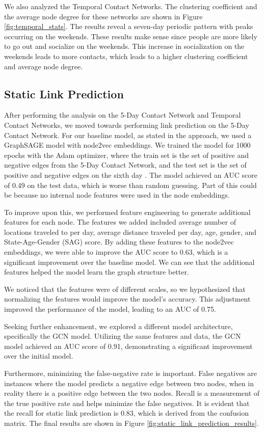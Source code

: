 \documentclass[times, 10pt,twocolumn]{article}
\begin{document}
We also analyzed the Temporal Contact Networks. The clustering coefficient and the average node degree for these networks are shown in Figure \ref{fig:temporal_stats}. The results reveal a seven-day periodic pattern with peaks occurring on the weekends. These results make sense since people are more likely to go out and socialize on the weekends. This increase in socialization on the weekends leads to more contacts, which leads to a higher clustering coefficient and average node degree.

\subsection{Static Link Prediction}
After performing the analysis on the 5-Day Contact Network and Temporal Contact Networks, we moved towards performing link prediction on the 5-Day Contact Network. For our baseline model, as stated in the approach, we used a GraphSAGE model with node2vec embeddings. We trained the model for 1000 epochs with the Adam optimizer, where the train set is the set of positive and negative edges from the 5-Day Contact Network, and the test set is the set of positive and negative edges on the sixth day \cite{kingma2017adam}. The model achieved an AUC score of 0.49 on the test data, which is worse than random guessing. Part of this could be because no internal node features were used in the node embeddings.

To improve upon this, we performed feature engineering to generate additional features for each node. The features we added included average number of locations traveled to per day, average distance traveled per day, age, gender, and State-Age-Gender (SAG) score. By adding these features to the node2vec embeddings, we were able to improve the AUC score to 0.63, which is a significant improvement over the baseline model. We can see that the additional features helped the model learn the graph structure better. 

We noticed that the features were of different scales, so we hypothesized that normalizing the features would improve the model's accuracy. This adjustment improved the performance of the model, leading to an AUC of 0.75.

Seeking further enhancement, we explored a different model architecture, specifically the GCN model. Utilizing the same features and data, the GCN model achieved an AUC score of 0.91, demonstrating a significant improvement over the initial model.

Furthermore, minimizing the false-negative rate is important. False negatives are instances where the model predicts a negative edge between two nodes, when in reality there is a positive edge between the two nodes. Recall is a measurement of the true positive rate and helps minimize the false negatives. It is evident that the recall for static link prediction is 0.83, which is derived from the confusion matrix. The final results are shown in Figure \ref{fig:static_link_prediction_results}.
\end{document}
